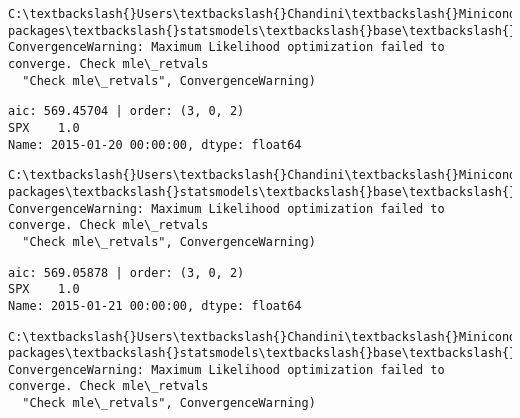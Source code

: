 \documentclass[11pt]{article}
\begin{document}
    \begin{Verbatim}[commandchars=\\\{\}]
C:\textbackslash{}Users\textbackslash{}Chandini\textbackslash{}Miniconda3\textbackslash{}envs\textbackslash{}auquan\textbackslash{}lib\textbackslash{}site-packages\textbackslash{}statsmodels\textbackslash{}base\textbackslash{}model.py:496: ConvergenceWarning: Maximum Likelihood optimization failed to converge. Check mle\_retvals
  "Check mle\_retvals", ConvergenceWarning)

    \end{Verbatim}

    \begin{Verbatim}[commandchars=\\\{\}]
aic: 569.45704 | order: (3, 0, 2)
SPX    1.0
Name: 2015-01-20 00:00:00, dtype: float64

    \end{Verbatim}

    \begin{Verbatim}[commandchars=\\\{\}]
C:\textbackslash{}Users\textbackslash{}Chandini\textbackslash{}Miniconda3\textbackslash{}envs\textbackslash{}auquan\textbackslash{}lib\textbackslash{}site-packages\textbackslash{}statsmodels\textbackslash{}base\textbackslash{}model.py:496: ConvergenceWarning: Maximum Likelihood optimization failed to converge. Check mle\_retvals
  "Check mle\_retvals", ConvergenceWarning)

    \end{Verbatim}

    \begin{Verbatim}[commandchars=\\\{\}]
aic: 569.05878 | order: (3, 0, 2)
SPX    1.0
Name: 2015-01-21 00:00:00, dtype: float64

    \end{Verbatim}

    \begin{Verbatim}[commandchars=\\\{\}]
C:\textbackslash{}Users\textbackslash{}Chandini\textbackslash{}Miniconda3\textbackslash{}envs\textbackslash{}auquan\textbackslash{}lib\textbackslash{}site-packages\textbackslash{}statsmodels\textbackslash{}base\textbackslash{}model.py:496: ConvergenceWarning: Maximum Likelihood optimization failed to converge. Check mle\_retvals
  "Check mle\_retvals", ConvergenceWarning)

    \end{Verbatim}
\end{document}
